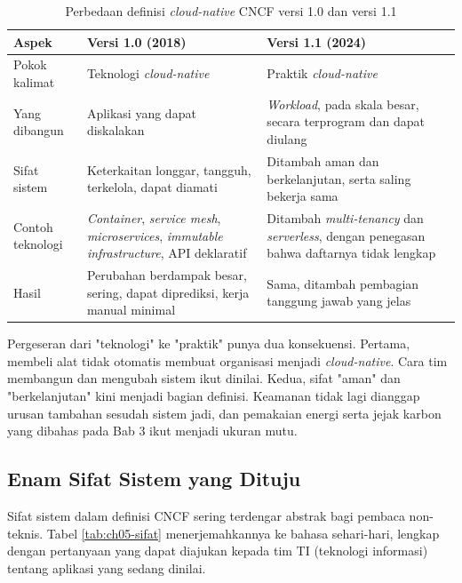 \begin{table}[!htb]
  \centering
  \footnotesize
  \caption{Perbedaan definisi \textit{cloud-native} CNCF versi 1.0 dan versi 1.1}
  \label{tab:ch05-versi-definisi}
  \begin{tabularx}{\textwidth}{>{\raggedright\arraybackslash}p{2.2cm}
    >{\raggedright\arraybackslash}X >{\raggedright\arraybackslash}X}
    \hline
    \textbf{Aspek} & \textbf{Versi 1.0 (2018)} & \textbf{Versi 1.1 (2024)} \\
    \hline
    Pokok kalimat & Teknologi \textit{cloud-native} & Praktik \textit{cloud-native} \\
    \hline
    Yang dibangun & Aplikasi yang dapat diskalakan & \textit{Workload}, pada skala besar,
      secara terprogram dan dapat diulang \\
    \hline
    Sifat sistem & Keterkaitan longgar, tangguh, terkelola, dapat diamati & Ditambah aman
      dan berkelanjutan, serta saling bekerja sama \\
    \hline
    Contoh teknologi & \textit{Container}, \textit{service mesh}, \textit{microservices},
      \textit{immutable infrastructure}, API deklaratif & Ditambah \textit{multi-tenancy}
      dan \textit{serverless}, dengan penegasan bahwa daftarnya tidak lengkap \\
    \hline
    Hasil & Perubahan berdampak besar, sering, dapat diprediksi, kerja manual minimal &
      Sama, ditambah pembagian tanggung jawab yang jelas \\
    \hline
  \end{tabularx}
\end{table}

Pergeseran dari "teknologi" ke "praktik" punya dua konsekuensi. Pertama, membeli alat tidak
otomatis membuat organisasi menjadi \textit{cloud-native}. Cara tim membangun dan mengubah
sistem ikut dinilai. Kedua, sifat "aman" dan "berkelanjutan" kini menjadi bagian definisi.
Keamanan tidak lagi dianggap urusan tambahan sesudah sistem jadi, dan pemakaian energi serta
jejak karbon yang dibahas pada Bab 3 ikut menjadi ukuran mutu.

\subsection{Enam Sifat Sistem yang Dituju}

Sifat sistem dalam definisi CNCF sering terdengar abstrak bagi pembaca non-teknis. Tabel
\ref{tab:ch05-sifat} menerjemahkannya ke bahasa sehari-hari, lengkap dengan pertanyaan yang
dapat diajukan kepada tim TI (teknologi informasi) tentang aplikasi yang sedang dinilai.

